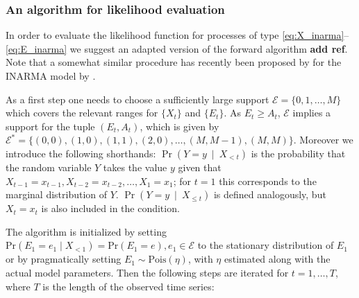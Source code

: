 \documentclass{article}
\begin{document}
\subsubsection{An algorithm for likelihood evaluation}

In order to evaluate the likelihood function for processes of type \eqref{eq:X_inarma}--\eqref{eq:E_inarma} we suggest an adapted version of the forward algorithm \textbf{add ref}. Note that a somewhat similar procedure has recently been proposed by \cite{Weiss2019} for the INARMA model by \cite{Dion1995}.

As a first step one needs to choose a sufficiently large support $\mathcal{E} = \{0, 1, \dots, M\}$ which covers the relevant ranges for $\{X_t\}$ and $\{E_t\}$. As $E_t \geq A_t$, $\mathcal{E}$ implies a support for the tuple $(E_t, A_t)$, which is given by $\mathcal{E}^* = \{(0, 0), (1, 0), (1, 1), (2, 0), \dots, (M, M - 1), (M, M)\}$. Moreover we introduce the following shorthands: $\Pr(Y = y \ \mid \ X_{ < t})$ is the probability that the random variable $Y$ takes the value $y$ given that $X_{t - 1} = x_{t - 1}, X_{t - 2} = x_{t - 2}, \dots, X_1 = x_1$; for $t= 1$ this corresponds to the marginal distribution of $Y$. $\Pr(Y = y \ \mid \ X_{ \leq t})$ is defined analogously, but $X_t = x_t$ is also included in the condition.

The algorithm is initialized by setting $\text{Pr}(E_1 = e_1 \mid X_{< 1}) = \text{Pr}(E_1 = e), e_1 \in \mathcal{E}$ to the stationary distribution of $E_1$ or by pragmatically setting $E_1 \sim \text{Pois}(\eta)$, with $\eta$ estimated along with the actual model parameters. %
Then the following steps are iterated for $t = 1, \dots, T$, where $T$ is the length of the observed time series:
\end{document}
